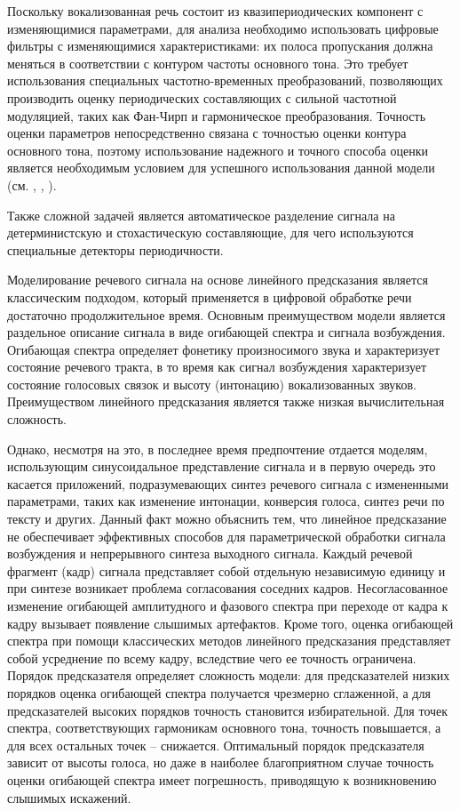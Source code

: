 Поскольку вокализованная речь состоит из квазипериодических компонент с изменяющимися параметрами, для анализа необходимо использовать цифровые фильтры с изменяющимися характеристиками: их полоса пропускания должна меняться в соответствии с контуром частоты основного тона. Это требует использования специальных частотно-временных преобразований, позволяющих производить оценку периодических составляющих с сильной частотной модуляцией, таких как Фан-Чирп и гармоническое преобразования. Точность оценки параметров непосредственно связана с точностью оценки контура основного тона, поэтому использование надежного и точного способа оценки является необходимым условием для успешного использования данной модели (см. , , ). 

Также сложной задачей является автоматическое разделение сигнала на детерминистскую и стохастическую составляющие, для чего используются специальные детекторы периодичности.

Моделирование речевого сигнала на основе линейного предсказания является классическим подходом, который применяется в цифровой обработке речи достаточно продолжительное время. Основным преимуществом модели является раздельное описание сигнала в виде огибающей спектра и сигнала возбуждения. Огибающая спектра определяет фонетику произносимого звука и характеризует состояние речевого тракта, в то время как сигнал возбуждения характеризует состояние голосовых связок и высоту (интонацию) вокализованных звуков. Преимуществом линейного предсказания является также низкая вычислительная сложность. 

Однако, несмотря на это, в последнее время предпочтение отдается моделям, использующим синусоидальное представление сигнала и в первую очередь это касается приложений, подразумевающих синтез речевого сигнала с измененными параметрами, таких как изменение интонации, конверсия голоса, синтез речи по тексту и других. Данный факт можно объяснить тем, что линейное предсказание не обеспечивает эффективных способов для параметрической обработки сигнала возбуждения и непрерывного синтеза выходного сигнала. Каждый речевой фрагмент (кадр) сигнала представляет собой отдельную независимую единицу и при синтезе возникает проблема согласования соседних кадров. Несогласованное изменение огибающей амплитудного и фазового спектра при переходе от кадра к кадру вызывает появление слышимых артефактов. Кроме того, оценка огибающей спектра при помощи классических методов линейного предсказания представляет собой усреднение по всему кадру, вследствие чего ее точность ограничена. Порядок предсказателя определяет сложность модели: для предсказателей низких порядков оценка огибающей спектра получается чрезмерно сглаженной, а для предсказателей высоких порядков точность становится избирательной. Для точек спектра, соответствующих гармоникам основного тона, точность повышается, а для всех остальных точек – снижается. Оптимальный порядок предсказателя зависит от высоты голоса, но даже в наиболее благоприятном случае точность оценки огибающей спектра имеет погрешность, приводящую к возникновению слышимых искажений.

